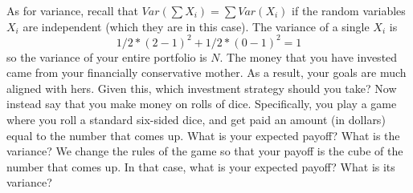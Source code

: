 \documentclass[12pt,twoside]{article}
\begin{document}
\begin{problem}{15}
{			As for variance, recall that $Var(\sum X_i) = \sum Var(X_i)$ if the random variables $X_i$ are independent (which they are in this case).  The variance of a single $X_i$ is
			$$1/2 * (2 - 1)^2 + 1/2*(0 - 1)^2 = 1$$
			so the variance of your entire portfolio is $N$. 
		}
		The money that you have invested came from your financially conservative mother.  As a result, your goals are much aligned with hers.  Given this,
		which investment strategy should you take?
		Now instead say that you make money on rolls of dice.  Specifically, you play a game where you roll a standard six-sided dice, and get paid an amount (in dollars) equal to
		 the number that comes up.  What is	your expected payoff?  What is the variance?
		We change the rules of the game so that your payoff is the cube of the number that comes up.  In that case, what is your expected payoff?  What is its variance?
\eparts


\end{problem}

\end{document}
